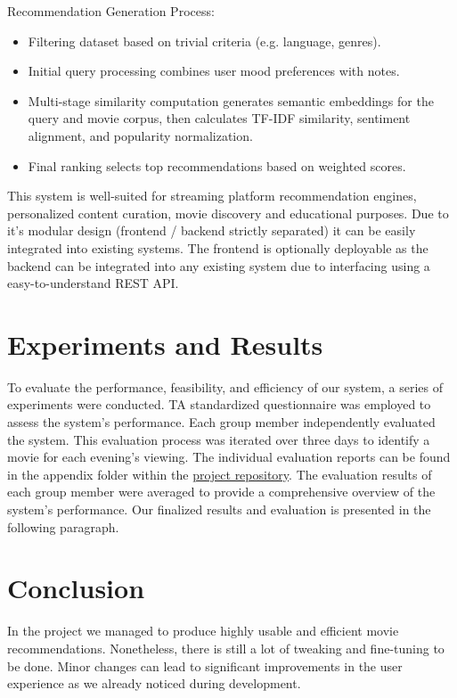 \documentclass[12pt,a4paper]{article}
\begin{document}
\noindent Recommendation Generation Process:
\begin{itemize}
  \item Filtering dataset based on trivial criteria (e.g. language, genres).
  \item Initial query processing combines user mood preferences with notes.
  \item Multi-stage similarity computation generates semantic embeddings for the query and movie corpus, then calculates TF-IDF similarity, sentiment alignment, and popularity normalization.
  \item Final ranking selects top recommendations based on weighted scores.
\end{itemize}

\noindent This system is well-suited for streaming platform recommendation engines, personalized content curation, movie discovery and educational purposes.
Due to it's modular design (frontend / backend strictly separated) it can be easily integrated into existing systems.
The frontend is optionally deployable as the backend can be integrated into any existing system due to interfacing
using a easy-to-understand REST API.

\section{Experiments and Results}

To evaluate the performance, feasibility, and efficiency of our system, a series of experiments were conducted.
TA standardized questionnaire was employed to assess the system’s performance.
Each group member independently evaluated the system.
This evaluation process was iterated over three days to identify a movie for each evening’s viewing.
The individual evaluation reports can be found in the appendix folder within the
\href{https://github.com/IImpaq/air-2024/appendix}{project repository}.
The evaluation results of each group member were averaged to provide a comprehensive overview of the system’s performance.
Our finalized results and evaluation is presented in the following paragraph.

\section{Conclusion}

In the project we managed to produce highly usable and efficient movie recommendations.
Nonetheless, there is still a lot of tweaking and fine-tuning to be done.
Minor changes can lead to significant improvements in the user experience as we already noticed during development.
\end{document}
